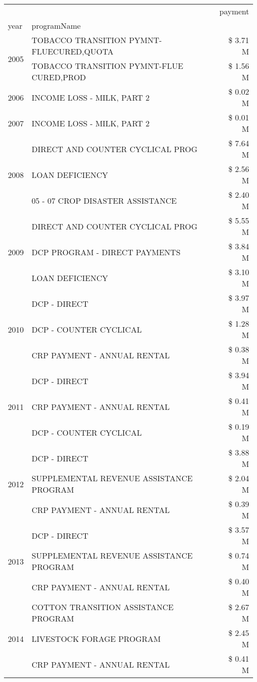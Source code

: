 \begin{tabular}{llr}
\toprule
 &  & payment \\
year & programName &  \\
\midrule
\multirow[t]{2}{*}{2005} & TOBACCO TRANSITION PYMNT-FLUECURED,QUOTA & \$ 3.71 M \\
 & TOBACCO TRANSITION PYMNT-FLUE CURED,PROD & \$ 1.56 M \\
\cline{1-3}
2006 & INCOME LOSS - MILK, PART 2 & \$ 0.02 M \\
\cline{1-3}
2007 & INCOME LOSS - MILK, PART 2 & \$ 0.01 M \\
\cline{1-3}
\multirow[t]{3}{*}{2008} & DIRECT AND COUNTER CYCLICAL PROG & \$ 7.64 M \\
 & LOAN DEFICIENCY & \$ 2.56 M \\
 & 05 - 07 CROP DISASTER ASSISTANCE & \$ 2.40 M \\
\cline{1-3}
\multirow[t]{3}{*}{2009} & DIRECT AND COUNTER CYCLICAL PROG & \$ 5.55 M \\
 & DCP PROGRAM - DIRECT PAYMENTS & \$ 3.84 M \\
 & LOAN DEFICIENCY & \$ 3.10 M \\
\cline{1-3}
\multirow[t]{3}{*}{2010} & DCP - DIRECT & \$ 3.97 M \\
 & DCP - COUNTER CYCLICAL & \$ 1.28 M \\
 & CRP PAYMENT - ANNUAL RENTAL & \$ 0.38 M \\
\cline{1-3}
\multirow[t]{3}{*}{2011} & DCP - DIRECT & \$ 3.94 M \\
 & CRP PAYMENT - ANNUAL RENTAL & \$ 0.41 M \\
 & DCP - COUNTER CYCLICAL & \$ 0.19 M \\
\cline{1-3}
\multirow[t]{3}{*}{2012} & DCP - DIRECT & \$ 3.88 M \\
 & SUPPLEMENTAL REVENUE ASSISTANCE PROGRAM & \$ 2.04 M \\
 & CRP PAYMENT - ANNUAL RENTAL & \$ 0.39 M \\
\cline{1-3}
\multirow[t]{3}{*}{2013} & DCP - DIRECT & \$ 3.57 M \\
 & SUPPLEMENTAL REVENUE ASSISTANCE PROGRAM & \$ 0.74 M \\
 & CRP PAYMENT - ANNUAL RENTAL & \$ 0.40 M \\
\cline{1-3}
\multirow[t]{3}{*}{2014} & COTTON TRANSITION ASSISTANCE PROGRAM & \$ 2.67 M \\
 & LIVESTOCK FORAGE PROGRAM & \$ 2.45 M \\
 & CRP PAYMENT - ANNUAL RENTAL & \$ 0.41 M \\

\end{tabular}
